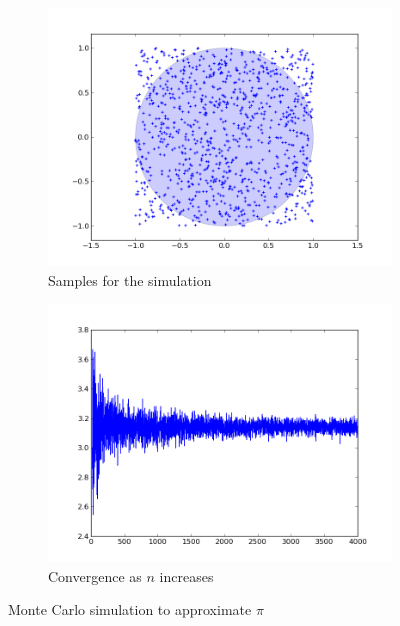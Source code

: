 \begin{figure}[h]
	\centering
	\begin{subfigure}{0.45\textwidth}
		\includegraphics[width=\textwidth]{./images/circle.png}
		\caption{Samples for the simulation}
	\end{subfigure}
	\begin{subfigure}{0.45\textwidth}
		\includegraphics[width=\textwidth]{./images/converge.png}
	\caption{Convergence as $n$ increases}
	\end{subfigure}
	\caption{Monte Carlo simulation to approximate $\pi$}
	\label{fig:monte-carlo-pi}
\end{figure}

